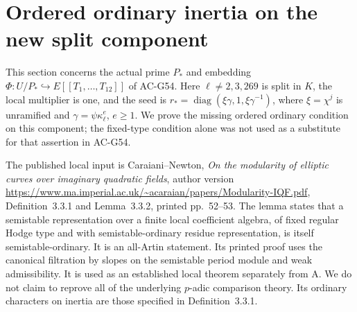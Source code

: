 \section{Ordered ordinary inertia on the new split component}
\label{sec:cubic-split-ordinary-points}

This section concerns the actual prime $P_*$ and embedding
$\Phi:U/P_*\hookrightarrow E[[T_1,\ldots,T_{12}]]$ of
AC-G54.  Here $\ell\ne2,3,269$ is split in $K$, the local
multiplier is one, and the seed is
$r_*=\operatorname{diag}(\xi\gamma,1,\xi\gamma^{-1})$,
where $\xi=\chi^j$ is unramified and
$\gamma=\psi\kappa_\ell^e$, $e\geq1$.
We prove the missing ordered ordinary condition on this
component; the fixed-type condition alone was not used as
a substitute for that assertion in AC-G54.

The published local input is Caraiani--Newton,
\emph{On the modularity of elliptic curves over imaginary
quadratic fields}, author version
\url{https://www.ma.imperial.ac.uk/~acaraian/papers/Modularity-IQF.pdf},
Definition~3.3.1 and Lemma~3.3.2, printed pp.~52--53.
The lemma states that a semistable representation over a
finite local coefficient algebra, of fixed regular Hodge
type and with semistable-ordinary residue representation,
is itself semistable-ordinary.  It is an all-Artin statement.
Its printed proof uses the canonical filtration by slopes
on the semistable period module and weak admissibility.
It is used as an established local theorem separately from
A.  We do not claim to reprove all of the underlying
$p$-adic comparison theory.  Its ordinary characters on
inertia are those specified in Definition~3.3.1.

